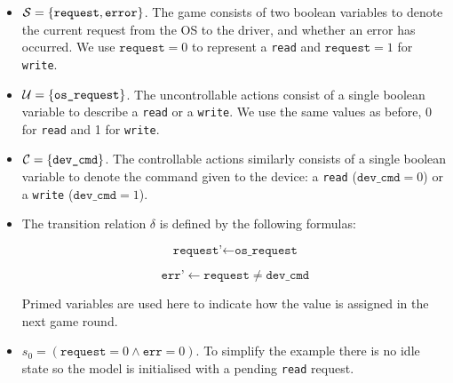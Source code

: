 \begin{itemize}
\item $\mathcal{S} = \{ \texttt{request}, \texttt{error} \} $. The game consists of two boolean variables to denote the current request from the OS to the driver, and whether an error has occurred. We use $\texttt{request} = 0$ to represent a \texttt{read} and $\texttt{request} = 1$ for \texttt{write}.
    \item $\mathcal{U} = \{ \texttt{os\_request} \} $. The uncontrollable actions consist of a single boolean variable to describe a \texttt{read} or a \texttt{write}. We use the same values as before, 0 for \texttt{read} and 1 for \texttt{write}.
    \item $\mathcal{C} = \{ \texttt{dev\_cmd} \}$. The controllable actions similarly consists of a single boolean variable to denote the command given to the device: a \texttt{read} ($\texttt{dev\_cmd} = 0$) or a \texttt{write} ($\texttt{dev\_cmd} = 1$).
    \item The transition relation $\delta$ is defined by the following formulas:

        $$ \texttt{request'} \gets \texttt{os\_request} $$

        $$ \texttt{err'} \gets \texttt{request} \neq \texttt{dev\_cmd} $$

        Primed variables are used here to indicate how the value is assigned in the next game round.

\item $s_0 = (\texttt{request} = 0 \land \texttt{err} = 0)$. To simplify the example there is no idle state so the model is initialised with a pending \texttt{read} request.

\end{itemize}


